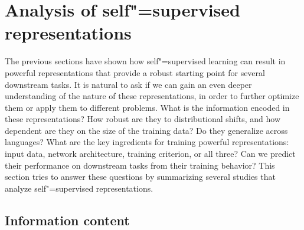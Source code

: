 
\section{Analysis of self"=supervised representations}
\label{analysis}

The previous sections have shown how self"=supervised learning can result in
powerful representations that provide a robust starting point for several
downstream tasks. It is natural to ask if we can gain an even deeper
understanding of the nature of these representations, in order to further
optimize them or apply them to different problems.
What is the information encoded in these representations? How robust are they
to distributional shifts, and how dependent are they on the size of the
training data? Do they generalize across languages? What are the key
ingredients for training powerful representations: input data, network
architecture, training criterion, or all three? Can we predict their
performance on downstream tasks from their training behavior? This section
tries to answer these questions by summarizing several studies that analyze
self"=supervised representations.

\subsection{Information content}

